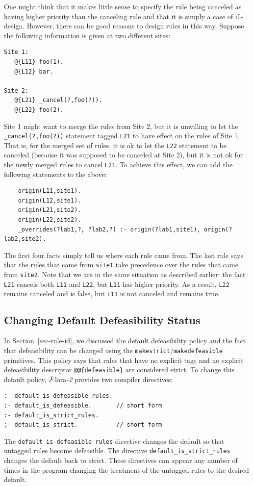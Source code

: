 \documentclass[11pt]{article}
\newcommand{\FLORA}{{\mbox{\sc ${\cal F}${lora}\rm\emph{-2}}}\xspace}
\begin{document}
One might think that it makes little sense to specify the rule being
canceled as having higher priority than the canceling rule and that it is
simply a case of ill-design. However, there can be good reasons to design
rules in this way. Suppose the following information is given at two different sites:
\begin{verbatim}
Site 1:
   @{L11} foo(1).
   @{L12} bar.

Site 2:
   @{L21} _cancel(?,foo(?)).  
   @{L22} foo(2).
\end{verbatim}
Site 1 might want to merge the rules from Site 2, but it is unwilling to
let the {\tt \_cancel(?,foo(?))} statement tagged {\tt L21} to have effect
on the rules of Site 1. That is, for the merged set of rules, it is ok to
let the {\tt L22} statement to be canceled (because it was supposed to be
canceled at Site 2), but it is not ok for the newly merged rules to cancel
{\tt L21}. To achieve this effect, we can add the following statements to
the above:
\begin{verbatim}
    origin(L11,site1).
    origin(L12,site1).
    origin(L21,site2).
    origin(L22,site2).
    _overrides(?lab1,?, ?lab2,?) :- origin(?lab1,site1), origin(?lab2,site2).
\end{verbatim}
The first four facts simply tell us where each rule came from.  The
last rule says that the rules that came from {\tt site1} take precedence
over the rules that came from {\tt site2}.  Note that we are in the same
situation as described earlier: the fact {\tt L21} cancels both {\tt L11}
and {\tt L22}, but {\tt L11} has higher priority. As a result, {\tt L22}
remains canceled and is false, but {\tt L11} is not canceled and remains
true.

\subsection{Changing  Default Defeasibility Status}

In Section~\ref{sec-rule-id}, we discussed the default
defeasibility policy and the fact that defeasibility can be changed using
the \texttt{makestrict}/\texttt{makedefeasible} primitives.  
This policy says that rules that have no explicit tags and no explicit
defeasibility descriptor \texttt{@@\{defeasible\}}  are considered strict. To change this default
policy, \FLORA provides two compiler directives:
\begin{verbatim}
:- default_is_defeasible_rules.
:- default_is_defeasible.       // short form
:- default_is_strict_rules.
:- default_is_strict.           // short form
\end{verbatim}
The \verb|default_is_defeasible_rules| directive changes the default so
that untagged rules become defeasible. The directive
\verb|default_is_strict_rules| changes the default back to strict.
These directives can appear any number of times in the program
changing the treatment of the untagged rules to the desired default.
\end{document}
